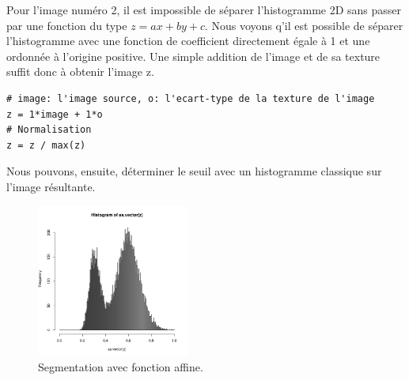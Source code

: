 \documentclass[11pt]{article}
\begin{document}
  Pour l'image numéro 2, il est impossible de séparer l'histogramme 2D sans passer par une fonction 
  du type $z=ax+by+c$. Nous voyons q'il est possible de séparer l'histogramme avec une fonction de 
  coefficient directement égale à 1 et une ordonnée à l'origine positive. Une simple addition de 
  l'image et de sa texture suffit donc à obtenir l'image z.
  
  \begin{lstlisting}[caption=L'équation de la droite en language R.]
# image: l'image source, o: l'ecart-type de la texture de l'image
z = 1*image + 1*o
# Normalisation
z = z / max(z)\end{lstlisting}

  Nous pouvons, ensuite, déterminer le seuil avec un histogramme classique sur l'image résultante.
  
  \begin{figure}[H]
    \center
    \includegraphics[width=5cm]{texture-2/texture-2-8-eq-hist.png}
    \caption{Segmentation avec fonction affine.}
  \end{figure}
  
\end{document}
